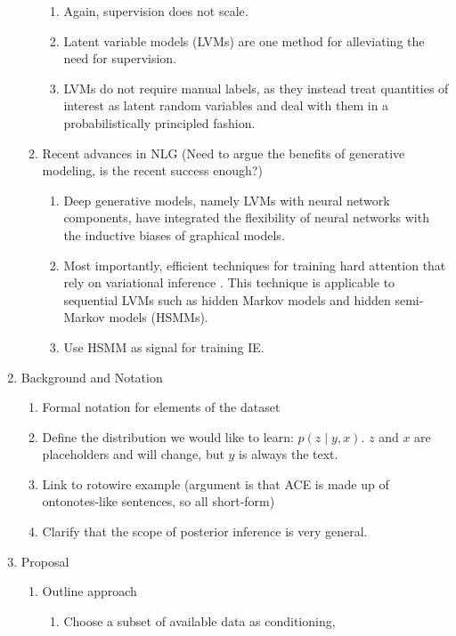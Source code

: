 \documentclass[11pt]{article}
\begin{document}
\begin{enumerate}
\begin{enumerate}
\begin{enumerate}
        \item Again, supervision does not scale.
        \item Latent variable models (LVMs) are one method for alleviating the need for supervision.
        \item LVMs do not require manual labels, as they instead treat quantities of interest
            as latent random variables and deal with them in a probabilistically principled 
            fashion.
        \end{enumerate}
    \item Recent advances in NLG
        (Need to argue the benefits of generative modeling, is the recent success enough?)
        \begin{enumerate}
        \item Deep generative models, namely LVMs with neural network components,
            have integrated the flexibility of neural networks with the
            inductive biases of graphical models.
        \item Most importantly, efficient techniques for training hard attention 
            that rely on variational inference \citep{deng2018attn}.
            This technique is applicable to sequential LVMs such as hidden Markov models 
            and hidden semi-Markov models (HSMMs).
        \item Use HSMM as signal for training IE.
        \end{enumerate}
    \end{enumerate}
\item Background and Notation
    \begin{enumerate}
    \item Formal notation for elements of the dataset
    \item Define the distribution we would like to learn: $p(z\mid y, x)$.
        $z$ and $x$ are placeholders and will change, but $y$ is always the text.
    \item Link to rotowire example
        (argument is that ACE is made up of ontonotes-like sentences, so all short-form)
    \item Clarify that the scope of posterior inference is very general.
    \end{enumerate}
\item Proposal
    \begin{enumerate}
    \item Outline approach
        \begin{enumerate}
        \item Choose a subset of available data as conditioning,

\end{enumerate}
\end{enumerate}
\end{enumerate}
\end{document}
